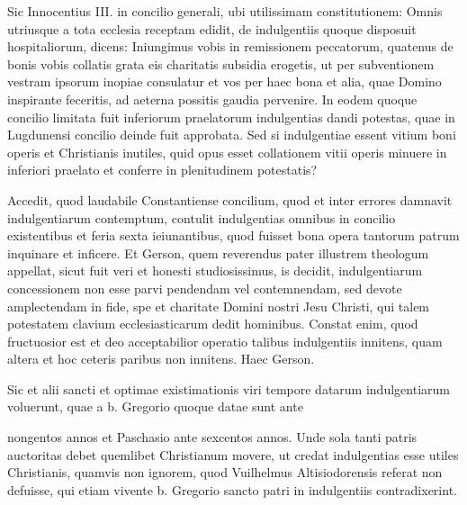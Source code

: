 Sic Innocentius III. in concilio generali, ubi utilissimam constitutionem: Omnis utriusque a tota ecclesia receptam edidit, de indulgentiis quoque disposuit hospitaliorum, dicens: Iniungimus vobis in remissionem peccatorum, quatenus de bonis vobis collatis grata eis charitatis subsidia erogetis, ut per subventionem vestram ipsorum inopiae consulatur et vos per haec bona et alia, quae Domino inspirante feceritis, ad aeterna possitis gaudia pervenire. In eodem quoque concilio limitata fuit inferiorum praelatorum indulgentias dandi potestas, quae in Lugdunensi concilio deinde fuit approbata. Sed si indulgentiae essent vitium boni operis et Christianis inutiles, quid opus esset collationem vitii operis minuere in inferiori praelato et conferre in plenitudinem potestatis?

Accedit, quod laudabile Constantiense concilium, quod et inter errores damnavit indulgentiarum contemptum, contulit indulgentias omnibus in concilio existentibus et feria sexta ieiunantibus, quod fuisset bona opera tantorum patrum inquinare et inficere. Et Gerson, quem reverendus pater illustrem theologum appellat, sicut fuit veri et honesti studiosissimus, is decidit, indulgentiarum concessionem non esse parvi pendendam vel contemnendam, sed devote amplectendam in fide, spe et charitate Domini nostri Jesu Christi, qui talem potestatem clavium ecclesiasticarum dedit hominibus. Constat enim, quod fructuosior est et deo acceptabilior operatio talibus indulgentiis innitens, quam altera et hoc ceteris paribus non innitens. Haec Gerson.

Sic et alii sancti et optimae existimationis viri tempore datarum indulgentiarum voluerunt, quae a b. Gregorio quoque datae sunt ante

nongentos annos et Paschasio ante sexcentos annos. Unde sola tanti patris auctoritas debet quemlibet Christianum movere, ut credat indulgentias esse utiles Christianis, quamvis non ignorem, quod Vuilhelmus Altisiodorensis referat non defuisse, qui etiam vivente b. Gregorio sancto patri in indulgentiis contradixerint.

